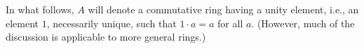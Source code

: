 In what follows, $A$ will denote a commutative ring having a unity element, i.e., an element $1$, necessarily unique, such that $1 \cdot a = a$ for all $a$. (However, much of the discussion is applicable to more general rings.)
